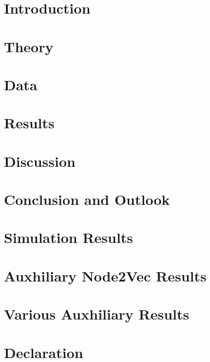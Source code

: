 \documentclass[12pt]{report}
\begin{document}
  \printacronyms[include=abbrev,name=List of Abbreviations]
  \newpage

  \onehalfspacing
  \chapter{Introduction}
  


  \chapter{Theory}
  \label{section:theory}
  
  \newpage
 

  \chapter{Data}
  \label{section:data}
  
  \newpage
  
  \chapter{Results}
  \label{section:results}
  
  \newpage
  
  \chapter{Discussion}
  \label{section:discussion}
  
  \newpage

  \chapter{Conclusion and Outlook}
  \label{section:conclusion_outlook}
  
  \newpage


  \renewcommand\bibname{References}
  
  \newpage

  \appendix
  \chapter{Simulation Results}
  
  \newpage

  \chapter[Auxhiliary Node2Vec]{Auxhiliary Node2Vec Results}
  
  \newpage

  \chapter{Various Auxhiliary Results}
  
  \newpage

  \chapter*{Declaration}
  
\end{document}
